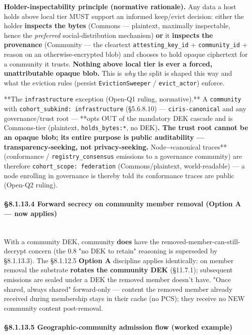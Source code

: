 \documentclass[11pt]{article}
\begin{document}
\textbf{Holder-inspectability principle (normative rationale).} Any data a host holds above local tier MUST support an informed keep/evict decision: either the holder \textbf{inspects the bytes} (Commons — plaintext, maximally inspectable, hence the \textit{preferred} social-distribution mechanism) \textbf{or} it \textbf{inspects the provenance} (Community — the cleartext \texttt{attesting\_key\_id} + \texttt{community\_id} + reason on an otherwise-encrypted blob) and chooses to hold opaque ciphertext for a community it trusts. \textbf{Nothing above local tier is ever a forced, unattributable opaque blob.} This is \textit{why} the split is shaped this way and what the eviction rules (persist \texttt{EvictionSweeper} / \texttt{evict\_actor}) enforce.


**The \texttt{infrastructure} exception (Open-Q1 ruling, normative).** A \texttt{community} with \texttt{cohort\_subkind: infrastructure} (§5.6.8.10) — \texttt{ciris-canonical} and any governance/trust root — **opts OUT of the mandatory DEK cascade and is Commons-tier (plaintext, \texttt{holds\_bytes:*}, no DEK)\textbf{. The trust root cannot be an opaque blob; its entire purpose is public auditability — transparency-seeking, not privacy-seeking. }Node→canonical traces** (conformance / \texttt{registry\_consensus} emissions to a governance community) are therefore \texttt{cohort\_scope: federation} (Commons/plaintext, world-readable) — a node enrolling in governance is thereby told its conformance traces are public (Open-Q2 ruling).


\paragraph{§8.1.13.4 Forward secrecy on community member removal (Option A — now applies)}\mbox{}\\


With a community DEK, community \textbf{does} have the removed-member-can-still-decrypt concern (the 0.8 "no DEK to retain" reasoning is superseded by §8.1.13.3). The §8.1.12.5 \textbf{Option A} discipline applies identically: on member removal the substrate \textbf{rotates the community DEK} (§11.7.1); subsequent emissions are sealed under a DEK the removed member doesn't have. "Once shared, always shared" forward-only — content the removed member already received during membership stays in their cache (no PCS); they receive no NEW community content post-removal.


\paragraph{§8.1.13.5 Geographic-community admission flow (worked example)}\mbox{}\\
\end{document}
